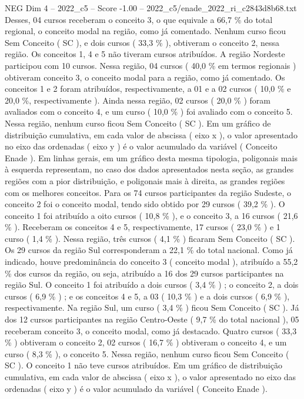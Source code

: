 \begin{textsample}{NEG Dim 4 – 2022\_c5 – Score -1.00 – 2022\_c5/enade\_2022\_ri\_c2843d8b68.txt}
Desses, 04 cursos receberam o conceito 3, o que equivale a 66,7 \% do total regional, o conceito modal na região, como já comentado.
Nenhum curso ficou Sem Conceito ( SC ), e dois cursos ( 33,3 \% ), obtiveram o conceito 2, nessa região.
Os conceitos 1, 4 e 5 não tiveram cursos atribuídos.
A região Nordeste participou com 10 cursos.
Nessa região, 04 cursos ( 40,0 \% em termos regionais ) obtiveram conceito 3, o conceito modal para a região, como já comentado.
Os conceitos 1 e 2 foram atribuídos, respectivamente, a 01 e a 02 cursos ( 10,0 \% e 20,0 \%, respectivamente ).
Ainda nessa região, 02 cursos ( 20,0 \% ) foram avaliados com o conceito 4, e um curso ( 10,0 \% ) foi avaliado com o conceito 5.
Nessa região, nenhum curso ficou Sem Conceito ( SC ).
Em um gráfico de distribuição cumulativa, em cada valor de abscissa ( eixo x ), o valor apresentado no eixo das ordenadas ( eixo y ) é o valor acumulado da variável ( Conceito Enade ).
Em linhas gerais, em um gráfico desta mesma tipologia, poligonais mais à esquerda representam, no caso dos dados apresentados nesta seção, as grandes regiões com a pior distribuição, e poligonais mais à direita, as grandes regiões com os melhores conceitos.
Para os 74 cursos participantes da região Sudeste, o conceito 2 foi o conceito modal, tendo sido obtido por 29 cursos ( 39,2 \% ).
O conceito 1 foi atribuído a oito cursos ( 10,8 \% ), e o conceito 3, a 16 cursos ( 21,6 \% ).
Receberam os conceitos 4 e 5, respectivamente, 17 cursos ( 23,0 \% ) e 1 curso ( 1,4 \% ).
Nessa região, três cursos ( 4,1 \% ) ficaram Sem Conceito ( SC ).
Os 29 cursos da região Sul corresponderam a 22,1 \% do total nacional.
Como já indicado, houve predominância do conceito 3 ( conceito modal ), atribuído a 55,2 \% dos cursos da região, ou seja, atribuído a 16 dos 29 cursos participantes na região Sul.
O conceito 1 foi atribuído a dois cursos ( 3,4 \% ) ; o conceito 2, a dois cursos ( 6,9 \% ) ; e os conceitos 4 e 5, a 03 ( 10,3 \% ) e a dois cursos ( 6,9 \% ), respectivamente.
Na região Sul, um curso ( 3,4 \% ) ficou Sem Conceito ( SC ).
Já dos 12 cursos participantes na região Centro-Oeste ( 9,7 \% do total nacional ), 05 receberam conceito 3, o conceito modal, como já destacado.
Quatro cursos ( 33,3 \% ) obtiveram o conceito 2, 02 cursos ( 16,7 \% ) obtiveram o conceito 4, e um curso ( 8,3 \% ), o conceito 5.
Nessa região, nenhum curso ficou Sem Conceito ( SC ).
O conceito 1 não teve cursos atribuídos.
Em um gráfico de distribuição cumulativa, em cada valor de abscissa ( eixo x ), o valor apresentado no eixo das ordenadas ( eixo y ) é o valor acumulado da variável ( Conceito Enade ).

\end{textsample}
